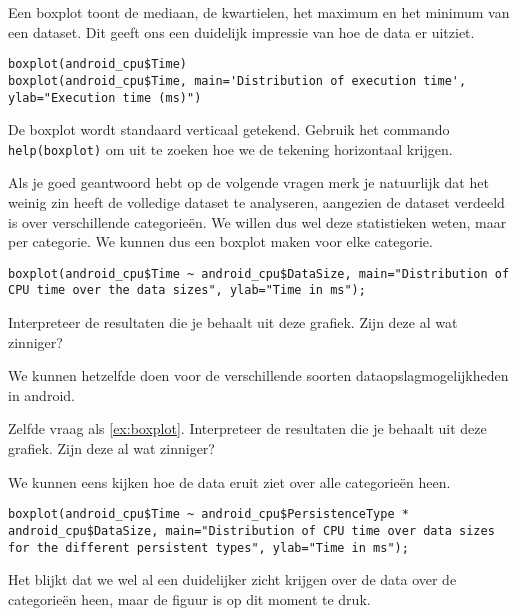 Een boxplot toont de mediaan, de kwartielen, het maximum en het minimum van een dataset. Dit geeft ons een duidelijk impressie van hoe de data er uitziet.

\begin{lstlisting}[breaklines=true]
boxplot(android_cpu$Time)
boxplot(android_cpu$Time, main='Distribution of execution time', ylab="Execution time (ms)")
\end{lstlisting} 

\begin{exercise}
	De boxplot wordt standaard verticaal getekend. Gebruik het commando \texttt{help(boxplot)} om uit te zoeken hoe we de tekening horizontaal krijgen. 
\end{exercise}

Als je goed geantwoord hebt op de volgende vragen merk je natuurlijk dat het weinig zin heeft de volledige dataset te analyseren, aangezien de dataset verdeeld is over verschillende categorie\"en. We willen dus wel deze statistieken weten, maar per categorie. We kunnen dus een boxplot maken voor elke categorie.

\begin{lstlisting}[breaklines=true]
boxplot(android_cpu$Time ~ android_cpu$DataSize, main="Distribution of CPU time over the data sizes", ylab="Time in ms");
\end{lstlisting}

\begin{exercise}
	\label{ex:boxplot}
	Interpreteer de resultaten die je behaalt uit deze grafiek. Zijn deze al wat zinniger?
\end{exercise}

We kunnen hetzelfde doen voor de verschillende soorten dataopslagmogelijkheden in android.

\begin{exercise}
	Zelfde vraag als \ref{ex:boxplot}. Interpreteer de resultaten die je behaalt uit deze grafiek. Zijn deze al wat zinniger?
\end{exercise}

We kunnen eens kijken hoe de data eruit ziet over alle categorie\"en heen.

\begin{lstlisting}[breaklines=true]
  boxplot(android_cpu$Time ~ android_cpu$PersistenceType * android_cpu$DataSize, main="Distribution of CPU time over data sizes for the different persistent types", ylab="Time in ms");
\end{lstlisting}

Het blijkt dat we wel al een duidelijker zicht krijgen over de data over de categorie\"en heen, maar de figuur is op dit moment te druk. 

